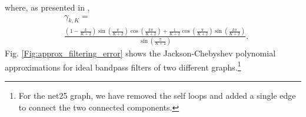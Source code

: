 \documentclass[journal, 10pt]{IEEEtran}
\begin{document}
where, as presented in \cite{di2016efficient}, 
\begin{align}
&\gamma_{k,K} =\label{Eq:damping2}\\
& \frac{(1-\frac{k}{K+2})\sin(\frac{\pi}{K+2})\cos(\frac{k\pi}{K+2})+\frac{1}{K+2}\cos(\frac{\pi}{K+2})\sin(\frac{k\pi}{K+2})}{\sin(\frac{\pi}{K+2})}.  \nonumber
\end{align}
Fig. \ref{Fig:approx_filtering_error} shows the Jackson-Chebyshev polynomial approximations for ideal bandpass filters of two different graphs.\footnote{For the net25 graph, we have removed the self loops and added a single edge to connect the two connected components.}
\end{document}
